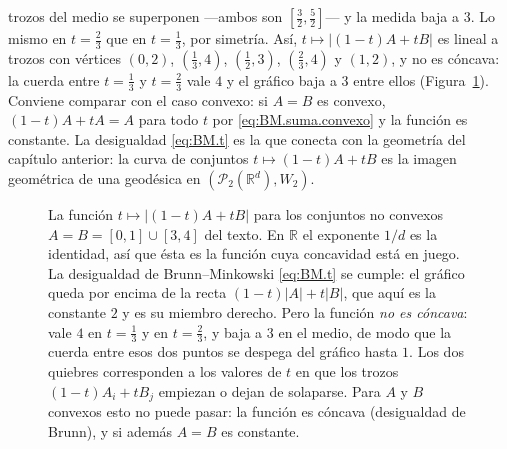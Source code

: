 \documentclass[12pt, a4paper]{amsbook}
\newcommand{\R}{{\mathbb R}}
\theoremstyle{remark}
\theoremstyle{definition}
\numberwithin{section}{chapter}
\numberwithin{subsection}{section}
\numberwithin{equation}{section}
\numberwithin{figure}{chapter}
\begin{document}
trozos del medio se superponen —ambos son $[\tfrac32,\tfrac52]$— y la medida
baja a $3$. Lo mismo en $t=\tfrac23$ que en $t=\tfrac13$, por simetría. Así,
$t\mapsto|(1-t)A+tB|$ es lineal a trozos con vértices
$(0,2)$, $(\tfrac13,4)$, $(\tfrac12,3)$, $(\tfrac23,4)$ y $(1,2)$, y no es
cóncava: la cuerda entre $t=\tfrac13$ y $t=\tfrac23$ vale $4$ y el gráfico
baja a $3$ entre ellos (Figura~\ref{fig.BM.noconcava}). Conviene comparar
con el caso convexo: si $A=B$ es convexo, $(1-t)A+tA=A$ para todo $t$ por
\eqref{eq:BM.suma.convexo} y la función es constante. La desigualdad \eqref{eq:BM.t} es la que
conecta con la geometría del capítulo anterior: la curva de conjuntos
$t\mapsto(1-t)A+tB$ es la imagen geométrica de una geodésica en
$(\mathcal P_2(\R^d),W_2)$.

\begin{figure}[ht]
\centering
{}
\caption{La función $t\mapsto|(1-t)A+tB|$ para los conjuntos no convexos
$A=B=[0,1]\cup[3,4]$ del texto. En $\R$ el exponente $1/d$ es la identidad,
así que ésta es la función cuya concavidad está en juego. La desigualdad de
Brunn--Minkowski \eqref{eq:BM.t} se cumple: el gráfico queda por encima de
la recta $(1-t)|A|+t|B|$, que aquí es la constante $2$ y es su miembro
derecho. Pero la función \emph{no es cóncava}: vale $4$ en $t=\tfrac13$ y en
$t=\tfrac23$, y baja a $3$ en el medio, de modo que la cuerda entre esos dos
puntos se despega del gráfico hasta $1$. Los dos quiebres corresponden a los
valores de $t$ en que los trozos $(1-t)A_i+tB_j$ empiezan o dejan de
solaparse. Para $A$ y $B$ convexos esto no puede pasar: la función es
cóncava (desigualdad de Brunn), y si además $A=B$ es constante.}
\label{fig.BM.noconcava}
\end{figure}
\end{document}
